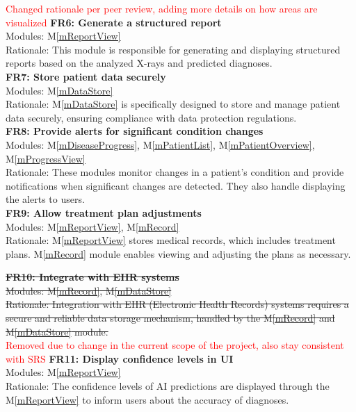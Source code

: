 \documentclass[12pt, titlepage]{article}
\newcommand{\mref}[1]{M\ref{#1}}
\begin{document}
\textcolor{red}{Changed rationale per peer review, adding more details on how areas are visualized}
\newline
\textbf{FR6: Generate a structured report} \\
Modules: \mref{mReportView} \\
Rationale: This module is responsible for generating and displaying structured reports based on the analyzed X-rays and predicted diagnoses. \\
\newline
\textbf{FR7: Store patient data securely} \\
Modules: \mref{mDataStore} \\
Rationale: \mref{mDataStore} is specifically designed to store and manage patient data securely, ensuring compliance with data protection regulations. \\
\newline
\textbf{FR8: Provide alerts for significant condition changes} \\
Modules: \mref{mDiseaseProgress}, \mref{mPatientList}, \mref{mPatientOverview}, \mref{mProgressView} \\
Rationale: These modules monitor changes in a patient's condition and provide notifications when significant changes are detected. They also handle displaying the alerts to users. \\
\newline
\textbf{FR9: Allow treatment plan adjustments} \\
Modules: \mref{mReportView}, \mref{mRecord} \\
Rationale: \mref{mReportView} stores medical records, which includes treatment plans. \mref{mRecord} module enables viewing and adjusting the plans as necessary. \\
\newline

\sout{\textbf{FR10: Integrate with EHR systems}} \\
\sout{Modules: \mref{mRecord}, \mref{mDataStore}} \\
\sout{Rationale: Integration with EHR (Electronic Health Records) systems requires a secure and reliable data storage mechanism, handled by the \mref{mRecord} and \mref{mDataStore} module.} \\
\textcolor{red}{Removed due to change in the current scope of the project, also stay consistent with SRS}
\newline
\textbf{FR11: Display confidence levels in UI} \\
Modules: \mref{mReportView} \\
Rationale: The confidence levels of AI predictions are displayed through the \mref{mReportView} to inform users about the accuracy of diagnoses. \\
\newline
\end{document}
